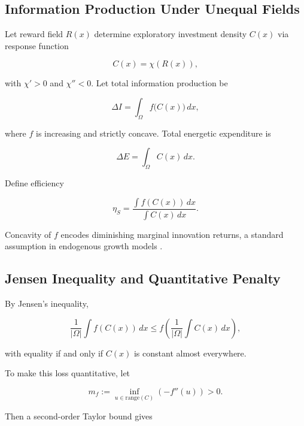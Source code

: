 \documentclass[12pt,a4paper]{article}
\theoremstyle{definition}
\begin{document}
\subsection{Information Production Under Unequal Fields}

Let reward field $R(x)$ determine exploratory investment density
$C(x)$ via response function

\begin{equation}
  C(x) = \chi(R(x)),
\end{equation}

with $\chi' > 0$ and $\chi'' < 0$.
Let total information production be

\begin{equation}
  \Delta I
  =
  \int_\Omega
  f\big(C(x)\big)
  \, dx,
  \label{eq:info_production}
\end{equation}

where $f$ is increasing and strictly concave.
Total energetic expenditure is

\begin{equation}
  \Delta E
  =
  \int_\Omega C(x)\, dx.
\end{equation}

Define efficiency

\begin{equation}
  \eta_S
  =
  \frac{
    \int f(C(x))\,dx
  }{
    \int C(x)\,dx
  }.
\end{equation}

Concavity of $f$ encodes diminishing marginal innovation returns,
a standard assumption in endogenous growth models
\citep{aghion2015}.

\subsection{Jensen Inequality and Quantitative Penalty}

By Jensen's inequality,

\begin{equation}
  \frac{1}{|\Omega|}
  \int f(C(x))\,dx
  \le
  f\!\left(
    \frac{1}{|\Omega|}
    \int C(x)\,dx
  \right),
\end{equation}

with equality if and only if $C(x)$ is constant almost everywhere.

To make this loss quantitative, let

\[
m_f := \inf_{u \in \mathrm{range}(C)}(-f''(u)) > 0.
\]

Then a second-order Taylor bound gives
\end{document}
